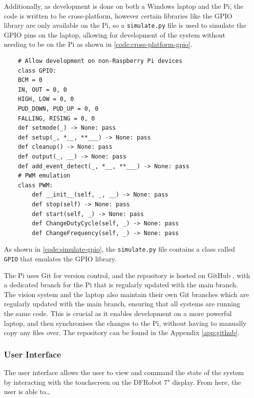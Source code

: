 Additionally, as development is done on both a Windows laptop and the Pi, the code is written to be cross-platform, however certain libraries like the GPIO library are only available on the Pi, so a \texttt{simulate.py} file is used to simulate the GPIO pins on the laptop, allowing for development of the system without needing to be on the Pi as shown in \autoref{code:cross-platform-gpio}.

\begin{minipage}[H]{\textwidth}
    \centering
    \begin{verbatim}
    # Allow development on non-Raspberry Pi devices
    class GPIO:
    BCM = 0
    IN, OUT = 0, 0
    HIGH, LOW = 0, 0
    PUD_DOWN, PUD_UP = 0, 0
    FALLING, RISING = 0, 0
    def setmode(_) -> None: pass
    def setup(_, *__, **___) -> None: pass
    def cleanup() -> None: pass
    def output(_, __) -> None: pass
    def add_event_detect(_, *__, **___) -> None: pass
    # PWM emulation
    class PWM:
        def __init__(self, _, __) -> None: pass
        def stop(self) -> None: pass
        def start(self, _) -> None: pass
        def ChangeDutyCycle(self, _) -> None: pass
        def ChangeFrequency(self, _) -> None: pass
    \end{verbatim}
    \label{code:simulate-gpio}
\end{minipage}

As shown in \autoref{code:simulate-gpio}, the \texttt{simulate.py} file contains a class called \texttt{GPIO} that emulates the GPIO library.

The Pi uses Git \cite{git} for version control, and the repository is hosted on GitHub \cite{github}, with a dedicated branch for the Pi that is regularly updated with the main branch. The vision system and the laptop also maintain their own Git branches which are regularly updated with the main branch, ensuring that all systems are running the same code. This is crucial as it enables development on a more powerful laptop, and then synchronises the changes to the Pi, without having to manually copy any files over. The repository can be found in the Appendix \ref{app:github}.
\subsubsection{User Interface}
The user interface allows the user to view and command the state of the system by interacting with the touchscreen on the DFRobot 7" display. From here, the user is able to\dots

